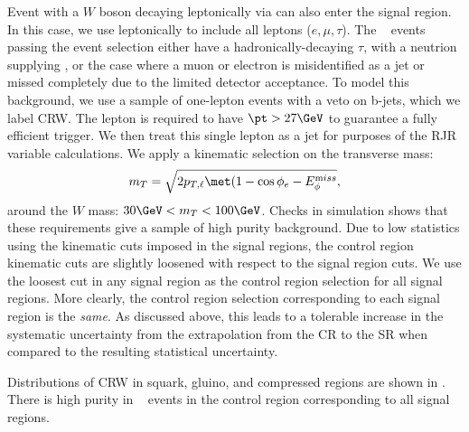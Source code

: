 Event with a $W$ boson decaying leptonically via \wln can also enter the signal region.
In this case, we use leptonically to include all leptons ($e,\mu,\tau$).
The \wjets~ events passing the event selection either have a hadronically-decaying $\tau$, with a neutrion supplying \met, or the case where a muon or electron is misidentified as a jet or missed completely due to the limited detector acceptance.
To model this background, we use a sample of one-lepton events with a veto on b-jets, which we label CRW.
The lepton is required to have $\pt > 27 \GeV$ to guarantee a fully efficient trigger.
We then treat this single lepton as a jet for purposes of the RJR variable calculations.
We apply a kinematic selection on the transverse mass:
\begin{align}
m_T = \sqrt{2p_{T,\ell} \met ( 1 - \cos{ \phi_{e} - \metphi } },
\end{align}
around the $W$ mass: $30 \GeV < m_T < 100 \GeV$.
Checks in simulation shows that these requirements give a sample of high purity \wln background.
Due to low statistics using the kinematic cuts imposed in the signal regions, the control region kinematic cuts are slightly loosened with respect to the signal region cuts.
We use the loosest cut in any signal region as the control region selection for all signal regions.
More clearly, the control region selection corresponding to each signal region is the \textit{same}.
As discussed above, this leads to a tolerable increase in the systematic uncertainty from the extrapolation from the CR to the SR when compared to the resulting statistical uncertainty.

Distributions of CRW in squark, gluino, and compressed regions are shown in .
There is high purity in \wjets~ events in the control region corresponding to all signal regions.

